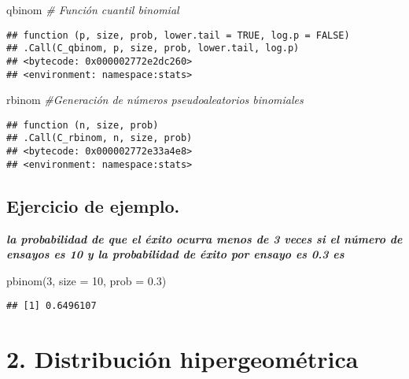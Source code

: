 \documentclass[
]{article}
\newenvironment{Shaded}{\begin{snugshade}}{\end{snugshade}}
\newcommand{\AttributeTok}[1]{\textcolor[rgb]{0.77,0.63,0.00}{#1}}
\newcommand{\CommentTok}[1]{\textcolor[rgb]{0.56,0.35,0.01}{\textit{#1}}}
\newcommand{\DecValTok}[1]{\textcolor[rgb]{0.00,0.00,0.81}{#1}}
\newcommand{\FloatTok}[1]{\textcolor[rgb]{0.00,0.00,0.81}{#1}}
\newcommand{\FunctionTok}[1]{\textcolor[rgb]{0.00,0.00,0.00}{#1}}
\newcommand{\NormalTok}[1]{#1}
\begin{document}
\begin{Shaded}
\begin{Highlighting}[]
\NormalTok{qbinom }\CommentTok{\#    Función cuantil binomial}
\end{Highlighting}
\end{Shaded}

\begin{verbatim}
## function (p, size, prob, lower.tail = TRUE, log.p = FALSE) 
## .Call(C_qbinom, p, size, prob, lower.tail, log.p)
## <bytecode: 0x000002772e2dc260>
## <environment: namespace:stats>
\end{verbatim}

\begin{Shaded}
\begin{Highlighting}[]
\NormalTok{rbinom  }\CommentTok{\#Generación de números pseudoaleatorios binomiales}
\end{Highlighting}
\end{Shaded}

\begin{verbatim}
## function (n, size, prob) 
## .Call(C_rbinom, n, size, prob)
## <bytecode: 0x000002772e33a4e8>
## <environment: namespace:stats>
\end{verbatim}

\hypertarget{ejercicio-de-ejemplo.}{%
\subsection{Ejercicio de ejemplo.}\label{ejercicio-de-ejemplo.}}

\textbf{\emph{la probabilidad de que el éxito ocurra menos de 3 veces si
el número de ensayos es 10 y la probabilidad de éxito por ensayo es 0.3
es}}

\begin{Shaded}
\begin{Highlighting}[]
\FunctionTok{pbinom}\NormalTok{(}\DecValTok{3}\NormalTok{, }\AttributeTok{size =} \DecValTok{10}\NormalTok{, }\AttributeTok{prob =} \FloatTok{0.3}\NormalTok{)}
\end{Highlighting}
\end{Shaded}

\begin{verbatim}
## [1] 0.6496107
\end{verbatim}

\hypertarget{distribuciuxf3n-hipergeomuxe9trica}{%
\section{2. Distribución
hipergeométrica}\label{distribuciuxf3n-hipergeomuxe9trica}}
\end{document}
